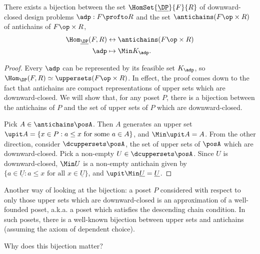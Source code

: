 \begin{lemma}
    There exists a bijection between the set $\HomSet{\underline{\DP}}{F}{R}$ of downward-closed design problems $\adp : F \profto R$ and the set $\antichains (F\op \times R)$ of antichains of $F\op \times R$, %
    \begin{equation}
        \begin{aligned}
            \Hom_{\underline{\DP}}(F,R) &\leftrightarrow \antichains (F\op \times R) \\
            \adp &\mapsto \Min K_\adp.
        \end{aligned}
    \end{equation}
\end{lemma}
\begin{proof}
    Every $\adp$ can be represented by its feasible set $K_\adp$, so $\Hom_\DP(F,R) \simeq \uppersets (F\op \times R)$. In effect, the proof comes down to the fact that antichains are compact representations of upper sets which are downward-closed. We will show that, for any poset $P$, there is a bijection between the antichains of $P$ and the set of upper sets of $P$ which are downward-closed.

    Pick $A \in \antichains\posA$. Then $A$ generates an upper set $\upit A = \{ x \in P : a \leq x \text{ for some $a \in A$} \}$, and $\Min \upit A = A$. From the other direction, consider $\dcuppersets \posA$, the set of upper sets of $\posA$ which are downward-closed. Pick a non-empty $U \in \dcuppersets \posA$. Since $U$ is downward-closed, $\Min U$ is a non-empty antichain given by $\{ a \in \underline{U} : a \leq x \text{ for all $x \in \underline{U}$} \}$, and $\upit \Min \underline{U} = \underline{U}$.
\end{proof}

\begin{remark}
    Another way of looking at the bijection: a poset $P$ considered with respect to only those upper sets which are downward-closed is an approximation of a well-founded poset, a.k.a. a poset which satisfies the descending chain condition. In such posets, there is a well-known bijection between upper sets and antichains (assuming the axiom of dependent choice).
\end{remark}
Why does this bijection matter?

